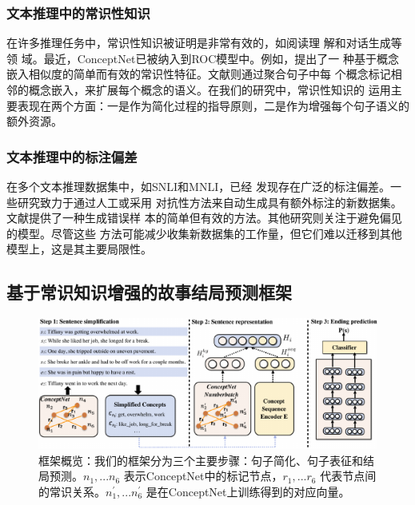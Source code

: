 \subsubsection*{文本推理中的常识性知识}
在许多推理任务中，常识性知识被证明是非常有效的，如阅读理
解\cite{mihaylov2018knowledgeable}和对话生成\cite{liu2018knowledge}等领
域。最近，ConceptNet已被纳入到ROC模型中。例如，\cite{chen2018incorporating}提出了一
种基于概念嵌入相似度的简单而有效的常识性特征。文献\cite{guan2018story}则通过聚合句子中每
个概念标记相邻的概念嵌入，来扩展每个概念的语义。在我们的研究中，常识性知识的
运用主要表现在两个方面：一是作为简化过程的指导原则，二是作为增强每个句子语义的额外资源。

\subsubsection*{文本推理中的标注偏差}
在多个文本推理数据集中，如SNLI\cite{bowman2015large}和MNLI\cite{gururangan2018annotation}，已经
发现存在广泛的标注偏差。一些研究致力于通过人工\cite{sharma2018tackling}或采用
对抗性方法\cite{zellers2018swag}来自动生成具有额外标注的新数据集。文献\cite{roemmele2017rnn}提供了一种生成错误样
本的简单但有效的方法。其他研究则关注于避免偏见的模型\cite{clark2019don,zhao2018gender}。尽管这些
方法可能减少收集新数据集的工作量，但它们难以迁移到其他模型上，这是其主要局限性。

\subsection{基于常识知识增强的故事结局预测框架}
\label{sec2:approach}

\begin{figure}
  \centering
  \includegraphics[width=\columnwidth]{figures/story/model}
  \caption{框架概览：我们的框架分为三个主要步骤：句子简化、句子表征和结局预测。${n_1,...n_6}$ 表示ConceptNet中的标记节点，${r_1,...r_6}$ 代表节点间的常识关系。${n_1^{'},...n_6^{'}}$ 是在ConceptNet上训练得到的对应向量。}
  \label{fig:model}
  \end{figure}

